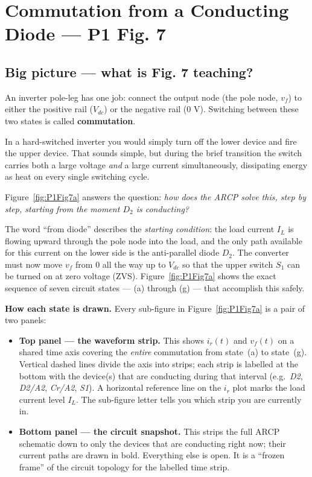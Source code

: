 \documentclass[12pt, a4paper]{article}
\def\,{ }%
\newcommand{\Vdc}{V_{dc}}
\newcommand{\vf}{v_f}
\newcommand{\ir}{i_r}
\newcommand{\IL}{I_L}
\newcommand{\figref}[1]{Figure~\ref{#1}}
\begin{document}
\section{Commutation from a Conducting Diode — P1 Fig.\,7}
\label{sec:P1Fig7}

\subsection*{Big picture — what is Fig.\,7 teaching?}

An inverter pole-leg has one job: connect the output node (the pole node,
$\vf$) to either the positive rail ($\Vdc$) or the negative rail (0\,V).
Switching between these two states is called \textbf{commutation}.

In a hard-switched inverter you would simply turn off the lower device and
fire the upper device.  That sounds simple, but during the brief transition
the switch carries both a large voltage \emph{and} a large current
simultaneously, dissipating energy as heat on every single switching cycle.

\figref{fig:P1Fig7a} answers the question: \emph{how does the ARCP solve this, step by
step, starting from the moment $D_2$ is conducting?}

The word ``from diode'' describes the \emph{starting condition}: the load
current $\IL$ is flowing upward through the pole node into the load, and the
only path available for this current on the lower side is the anti-parallel
diode $D_2$.  The converter must now move $\vf$ from 0 all the way up to
$\Vdc$ so that the upper switch $S_1$ can be turned on at zero voltage
(ZVS).  \figref{fig:P1Fig7a} shows the exact sequence of seven circuit states ---
(a)\,through\,(g) --- that accomplish this safely.

\medskip
\noindent
\textbf{How each state is drawn.}
Every sub-figure in \figref{fig:P1Fig7a} is a pair of two panels:
\begin{itemize}
    \item \textbf{Top panel --- the waveform strip.}
          This shows $\ir(t)$ and $\vf(t)$ on a shared time axis covering
          the \emph{entire} commutation from state~(a) to state~(g).
          Vertical dashed lines divide the axis into strips; each strip is
          labelled at the bottom with the device(s) that are conducting
          during that interval (e.g.\ \textit{D2}, \textit{D2/A2},
          \textit{Cr/A2}, \textit{S1}).
          A horizontal reference line on the $\ir$ plot marks the load
          current level $\IL$.
          The sub-figure letter tells you which strip you are currently in.

    \item \textbf{Bottom panel --- the circuit snapshot.}
          This strips the full ARCP schematic down to only the devices
          that are conducting right now; their current paths are drawn in
          bold.  Everything else is open.  It is a ``frozen frame'' of the
          circuit topology for the labelled time strip.
\end{itemize}
\end{document}
